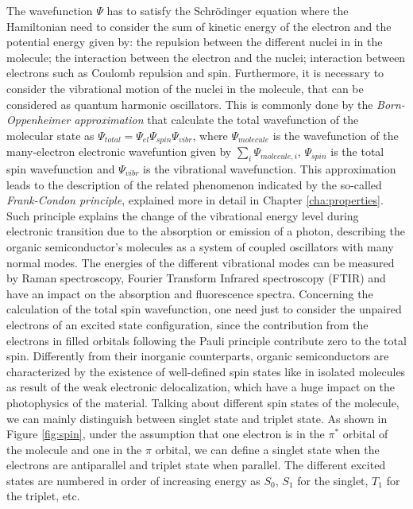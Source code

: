 \documentclass  [
  paper    = a4,
  BCOR     = 10mm,
  twoside,
  fontsize = 12pt,
  fleqn,
  toc      = bibnumbered,
  toc      = listofnumbered,
  numbers  = noendperiod,
  headings = normal,
  listof   = leveldown,
  version  = 3.03
]                                       {scrreprt}
\begin{document}
The wavefunction $\Psi$ has to satisfy the Schr\"odinger equation where the Hamiltonian need to consider the sum of kinetic energy of the electron and the potential energy given by: the repulsion between the different nuclei in in the molecule; the interaction between the electron and the nuclei; interaction between electrons such as Coulomb repulsion and spin. Furthermore, it is necessary to consider the vibrational motion of the nuclei in the molecule, that can be considered as quantum harmonic oscillators. This is commonly done by the \emph{Born-Oppenheimer approximation} that calculate the total wavefunction of the molecular state as $\Psi_{total}=\Psi_{el}\Psi_{spin}\Psi_{vibr}$, where $\Psi_{molecule}$ is the wavefunction of the many-electron electronic wavefuntion given by $\sum_{i}\Psi_{molecule,i}$, $\Psi_{spin}$ is the total spin wavefunction and $\Psi_{vibr}$ is the vibrational wavefunction. This approximation leads to the description of the related phenomenon indicated by the so-called \emph{Frank-Condon principle}, explained more in detail in Chapter \ref{cha:properties}. Such principle explains the change of the vibrational energy level during electronic transition due to the absorption or emission of a photon, describing the organic semiconductor's molecules as a system of coupled oscillators with many normal modes. The energies of the different vibrational modes can be measured by Raman spectroscopy, Fourier Transform Infrared spectroscopy (FTIR) and have an impact on the absorption and fluorescence spectra. Concerning the calculation of the total spin wavefunction, one need just to consider the unpaired electrons of an excited state configuration, since the contribution from the electrons in filled orbitals following the Pauli principle contribute zero to the total spin. Differently from their inorganic counterparts, organic semiconductors are characterized by the existence of well-defined spin states like in isolated molecules as result of the weak electronic delocalization, which have a huge impact on the photophysics of the material. Talking about different spin states of the molecule, we can mainly distinguish between singlet state and triplet state. As shown in Figure \ref{fig:spin}, under the assumption that one electron is in the $\pi^*$ orbital of the molecule and one in the $\pi$ orbital, we can define a singlet state when the electrons are antiparallel and triplet state when parallel. The different excited states are numbered in order of increasing energy as $S_0$, $S_1$ for the singlet, $T_1$ for the triplet, etc.\\
\end{document}
